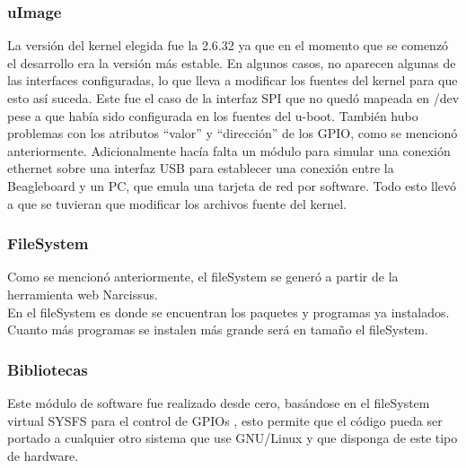 \documentclass[%
        final,
        notitlepage,
        narroweqnarray,
        inline,
        ]{ieee}
\begin{document}
\subsubsection{uImage}
La versión del kernel elegida fue la 2.6.32 ya que en el momento que se comenzó el desarrollo era la versión más estable.
En algunos casos, 
no aparecen algunas de las interfaces configuradas, lo que lleva a modificar los fuentes del kernel para que esto así suceda. Este fue el caso de la interfaz SPI que no quedó mapeada en /dev pese a que había sido configurada en los fuentes del u-boot. También hubo problemas con los atributos “valor” y “dirección” de los GPIO, como se mencionó anteriormente. Adicionalmente hacía falta un módulo para simular una conexión ethernet sobre una interfaz USB para establecer una conexión entre la Beagleboard y un PC, que emula una tarjeta de red por software.
Todo esto llevó a que se tuvieran que modificar los archivos fuente del kernel.

\subsubsection{FileSystem}

Como se mencionó anteriormente, el fileSystem se generó a partir de la herramienta web Narcissus.\\
En el fileSystem es donde se encuentran los paquetes y programas ya instalados. Cuanto más programas se instalen más grande será en tamaño el fileSystem.

\subsubsection{Bibliotecas}


Este módulo de software fue realizado desde cero, basándose en el fileSystem virtual SYSFS para el control de GPIOs \cite{gpio} \cite{gpioK}, esto permite que el código pueda ser portado a cualquier otro sistema que use GNU/Linux y que disponga de este tipo de hardware.
\end{document}
